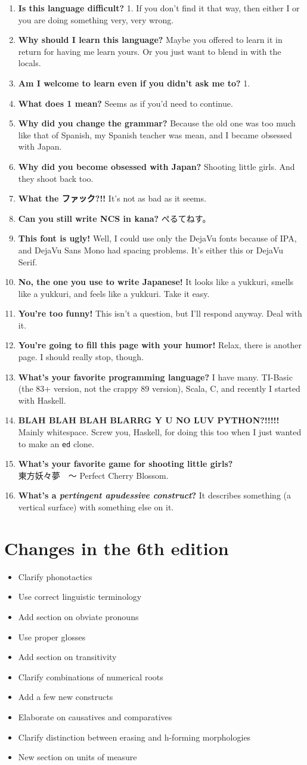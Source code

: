 \documentclass{book}
\newcommand{\qa}[2]{\item \textbf{#1} #2}
\begin{document}
\begin{enumerate}
  \qa{Is this language difficult?}{1. If you don't find it that way, then either I or you are doing something very, very wrong.}
  \qa{Why should I learn this language?}{Maybe you offered to learn it in return for having me learn yours. Or you just want to blend in with the locals.}
  \qa{Am I welcome to learn even if you didn't ask me to?}{1.}
  \qa{What does 1 mean?}{Seems as if you'd need to continue.}
  \qa{Why did you change the grammar?}{Because the old one was too much like that of Spanish, my Spanish teacher was mean, and I became obsessed with Japan.}
  \qa{Why did you become obsessed with Japan?}{Shooting little girls. And they shoot back too.}
  \qa{What the \textsf{ファック}?!!}{It's not as bad as it seems.}
  \qa{Can you still write NCS in kana?}{\textsf{ぺるてねす。}}
  \qa{This font is ugly!}{Well, I could use only the DejaVu fonts because of IPA, and DejaVu Sans Mono had spacing problems. It's either this or DejaVu Serif.}
  \qa{No, the one you use to write Japanese!}{It looks like a yukkuri, smells like a yukkuri, and feels like a yukkuri. Take it easy.}
  \qa{You're too funny!}{This isn't a question, but I'll respond anyway. Deal with it.}
  \qa{You're going to fill this page with your humor!}{Relax, there is another page. I should really stop, though.}
  \qa{What's your favorite programming language?}{I have many. TI-Basic (the 83+ version, not the crappy 89 version), Scala, C, and recently I started with Haskell.}
  \qa{BLAH BLAH BLAH BLARRG Y U NO LUV PYTHON?!!!!!}{Mainly whitespace. Screw you, Haskell, for doing this too when I just wanted to make an \texttt{ed} clone.}
  \qa{What's your favorite game for shooting little girls?}{\\\textsf{東方妖々夢　～} Perfect Cherry Blossom.}
  \qa{What's a \emph{pertingent apudessive construct}?}{It describes something (a vertical surface) with something else on it.}
\end{enumerate}

\section{Changes in the 6th edition}

\begin{itemize}
	\item Clarify phonotactics
	\item Use correct linguistic terminology
	\item Add section on obviate pronouns
	\item Use proper glosses
	\item Add section on transitivity
	\item Clarify combinations of numerical roots
	\item Add a few new constructs
	\item Elaborate on causatives and comparatives
	\item Clarify distinction between erasing and h-forming morphologies
	\item New section on units of measure
\end{itemize}
\end{document}
